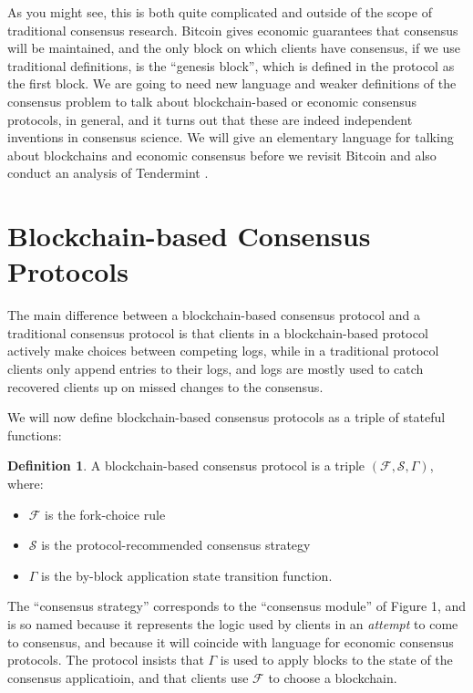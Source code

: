 \documentclass[11pt,a4paper]{article}
\theoremstyle{plain}
\theoremstyle{definition}
\newtheorem{defn}{Definition}
\begin{document}
As you might see, this is both quite complicated and outside of the scope of traditional consensus research. Bitcoin gives economic guarantees that consensus will be maintained, and the only block on which clients have consensus, if we use traditional definitions, is the ``genesis block'', which is defined in the protocol as the first block. We are going to need new language and weaker definitions of the consensus problem to talk about blockchain-based or economic consensus protocols, in general, and it turns out that these are indeed independent inventions in consensus science. We will give an elementary language for talking about blockchains and economic consensus before we revisit Bitcoin and also conduct an analysis of Tendermint \cite{Tendermint}.

\section{Blockchain-based Consensus Protocols}

The main difference between a blockchain-based consensus protocol and a traditional consensus protocol is that clients in a blockchain-based protocol actively make choices between competing logs, while in a traditional protocol clients only append entries to their logs, and logs are mostly used to catch recovered clients up on missed changes to the consensus. 

We will now define blockchain-based consensus protocols as a triple of stateful functions:

\begin{defn}
A blockchain-based consensus protocol is a triple $(\mathcal{F}, \mathcal{S}, \Gamma)$, where:
\begin{itemize}
\item $\mathcal{F}$ is the fork-choice rule
\item $\mathcal{S}$ is the protocol-recommended consensus strategy
\item $\Gamma$ is the by-block application state transition function.
\end{itemize}
\end{defn}

The ``consensus strategy'' corresponds to the ``consensus module'' of Figure 1, and is so named because it represents the logic used by clients in an \emph{attempt} to come to consensus, and because it will coincide with language for economic consensus protocols. The protocol insists that $\Gamma$ is used to apply blocks to the state of the consensus applicatioin, and that clients use $\mathcal{F}$ to choose a blockchain. 
\end{document}
